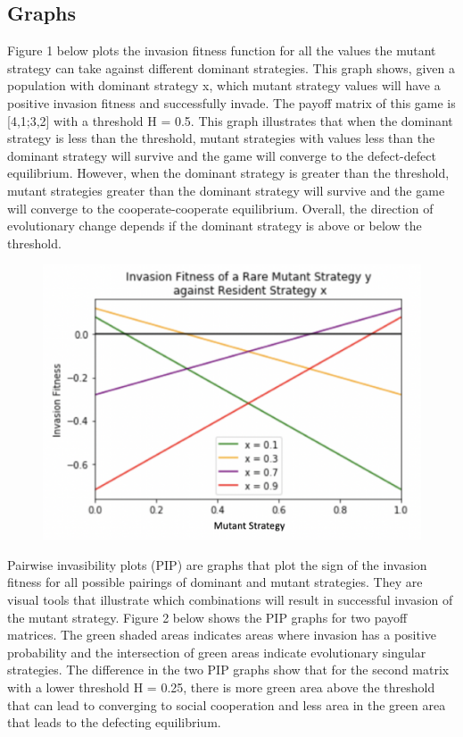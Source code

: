 \documentclass[]{llncs}
\begin{document}
\subsection{Graphs}

Figure 1 below plots the invasion fitness function for all the values the mutant strategy can take against different dominant strategies. This graph shows, given a population with dominant strategy x, which mutant strategy values will have a positive invasion fitness and successfully invade. The payoff matrix of this game is [4,1;3,2] with a threshold H = 0.5. This graph illustrates that when the dominant strategy is less than the threshold, mutant strategies with values less than the dominant strategy will survive and the game will converge to the defect-defect equilibrium. However, when the dominant strategy is greater than the threshold, mutant strategies greater than the dominant strategy will survive and the game will converge to the cooperate-cooperate equilibrium. Overall, the direction of evolutionary change depends if the dominant strategy is above or below the threshold. \\

\begin{figure}
\centering
\includegraphics[width=12cm]{images/inv_fit_basic}
\caption{ }
\end{figure}

Pairwise invasibility plots (PIP) are graphs that plot the sign of the invasion fitness for all possible pairings of dominant and mutant strategies. They are visual tools that illustrate which combinations will result in successful invasion of the mutant strategy. Figure 2 below shows the PIP graphs for two payoff matrices. The green shaded areas indicates areas where invasion has a positive probability and the intersection of green areas indicate evolutionary singular strategies. The difference in the two PIP graphs show that for the second matrix with a lower threshold H = 0.25, there is more green area above the threshold that can lead to converging to social cooperation and less area in the green area that leads to the defecting equilibrium. 
\end{document}
